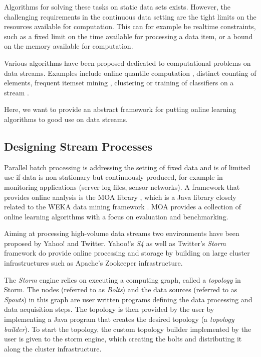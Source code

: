 Algorithms for solving these tasks on static data sets
exists. However, the challenging requirements in the continuous data
setting are the tight limits on the resources available for
computation. This can for example be realtime constraints, such as a
fixed limit on the time available for processing a data item, or a
bound on the memory available for computation.

Various algorithms have been proposed dedicated to computational
problems on data streams. Examples include online quantile computation
\cite{Greenwald/Khanna/2001a,Arasu/Manku/2004a}, distinct counting of
elements, frequent itemset mining
\cite{Charikar02findingfrequent,goethals2007,Cheng06maintainingfrequent},
clustering \cite{sohler2010,Aggarwal:2003} or training of classifiers
on a stream \cite{Domingos/Hulten/2000a}.

Here, we want to provide an abstract framework for putting online
learning algorithms to good use on data streams.

\subsection{Designing Stream Processes}

Parallel batch processing is addressing the setting of fixed data and
is of limited use if data is non-stationary but continuously produced,
for example in monitoring applications (server log files, sensor
networks).  A framework that provides online analysis is the MOA
library \cite{moa}, which is a Java library closely related to the
WEKA data mining framework \cite{weka}. MOA provides a collection of
online learning algorithms with a focus on evaluation and
benchmarking.

Aiming at processing high-volume data streams two environments have
been proposed by Yahoo! and Twitter. Yahoo!'s {\em S4} \cite{s4io} as
well as Twitter's {\em Storm} \cite{storm} framework do provide online
processing and storage by building on large cluster infrastructures such
as Apache's Zookeeper infrastructure.

The {\em Storm} engine relies on executing a computing graph, called a
{\em topology} in Storm. The nodes (referred to as {\em Bolts}) and the data sources (referred to as {\em Spouts})
in this graph are user written programs defining the data processing and data acquisition
steps. The topology is then provided by the user by implementing a
Java program that creates the desired topology (a {\em topology
  builder}). To start the topology, the custom topology builder
implemented by the user is given to the storm engine, which creating
the bolts and distributing it along the cluster infrastructure.

